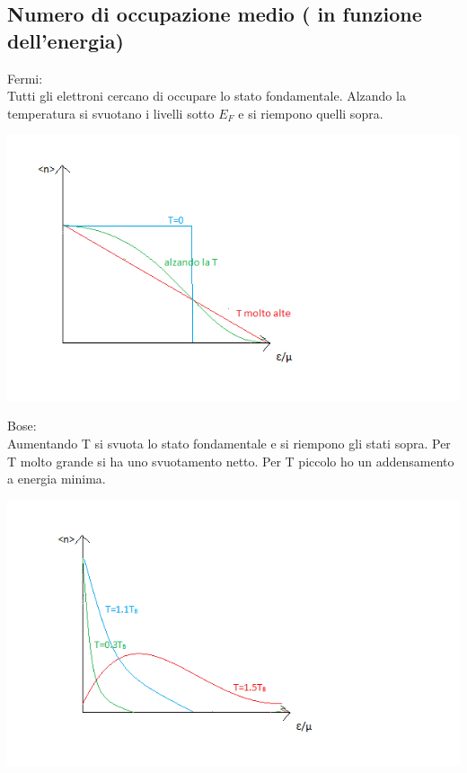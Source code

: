 \subsection{Numero di occupazione medio ( in funzione dell'energia)}
Fermi: \\ Tutti gli elettroni cercano di occupare lo stato fondamentale.
Alzando la temperatura si svuotano i livelli sotto $E_{F}$ e si riempono quelli sopra.
\begin{center}
\includegraphics[scale=1]{immagini/n-occ-fermi.png}
\end{center}
Bose:\\ Aumentando T si svuota lo stato fondamentale e si riempono gli stati sopra.
Per T molto grande si ha uno svuotamento netto. Per T piccolo ho un addensamento a energia minima.
\begin{center}
\includegraphics[scale=1]{immagini/n-occ-bose.png}
\end{center}
 
